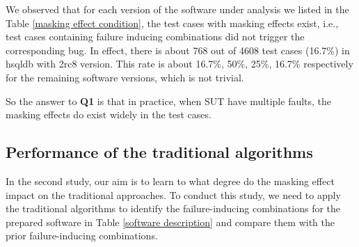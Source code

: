 \documentclass{sig-alternate}
\begin{document}
We observed that for each version of the software under analysis we listed in the Table \ref{masking effect condition}, the test cases with masking effects exist, i.e., test cases containing failure inducing combinations did not trigger the corresponding bug. In effect, there is about 768 out of 4608 test cases (16.7\%) in hsqldb with 2rc8 version. This rate is about 16.7\%, 50\%, 25\%, 16.7\% respectively for the remaining software versions, which is not trivial.

So the answer to \textbf{Q1} is that in practice, when SUT have multiple faults, the masking effects do exist widely in the test cases.

%
%

\subsection{Performance of the traditional algorithms}
In the second study, our aim is to learn to what degree do the masking effect impact on the traditional approaches. To conduct this study, we need to apply the traditional algorithms to identify the failure-inducing combinations for the prepared software in Table \ref{software description} and compare them with the prior failure-inducing combinations.

%
\end{document}
